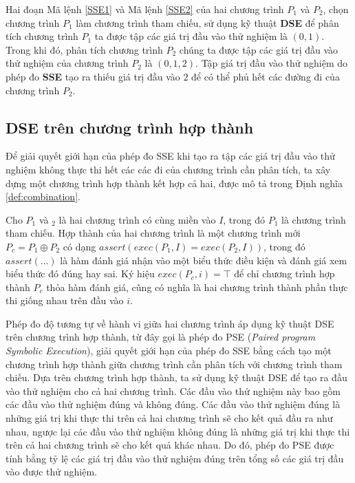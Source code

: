 Hai đoạn Mã lệnh \ref{SSE1} và Mã lệnh \ref{SSE2} của hai chương trình
$P_{1}$ và $P_{2}$, chọn chương trình $P_{1}$ làm chương trình tham
chiếu, sử dụng kỹ thuật \textbf{DSE} để phân tích chương trình $P_{1}$
ta được tập các giá trị đầu vào thử nghiệm là ${(0, 1)}$. Trong khi
đó, phân tích chương trình $P_{2}$ chúng ta được tập các giá trị đầu
vào thử nghiệm của chương trình $P_{2}$ là ${(0, 1, 2)}$. Tập giá trị đầu vào thử nghiệm do phép đo \textbf{SSE} tạo ra thiếu giá trị đầu vào $2$ để có thể phủ hết các đường đi của chương trình $P_{2}$.

\subsection{DSE trên chương trình hợp thành}

Để giải quyết giới hạn của phép đo SSE khi tạo ra tập các giá trị đầu
vào thử nghiệm không thực thi hết các các đi của chương trình cần phân
tích, ta xây dựng một chương trình hợp thành kết hợp cả hai, được mô
tả trong Định nghĩa \ref{def:combination}.

\begin{definition}
  \label{def:combination}
  Cho $P_1$ và $_2$ là hai chương trình có cùng miền vào $I$, trong đó
  $P_1$ là chương trình tham chiếu. Hợp thành của hai chương trình là
  một chương trình mới $P_c = P_1 \oplus P_2$ có dạng
  $assert(exec(P_{1}, I) = exec(P_{2}, I))$, trong đó $assert(\dots)$
  là hàm đánh giá nhận vào một biểu thức điều kiện và đánh giá xem
  biểu thức đó đúng hay sai. Ký hiệu $exec(P_c,i) = \top$ để chỉ
  chương trình hợp thành $P_c$ thỏa hàm đánh giá, cũng có nghĩa là hai
  chương trình thành phần thực thi giống nhau trên đầu vào $i$.
\end{definition}

Phép đo độ tương tự về hành vi giữa hai chương trình áp dụng kỹ thuật
DSE trên chương trình hợp thành, từ đây gọi là phép đo PSE
(\emph{Paired program Symbolic Execution}), giải quyết giới hạn của
phép đo SSE bằng cách tạo một chương trình hợp thành giữa chương trình
cần phân tích với chương trình tham chiếu. Dựa trên chương trình hợp
thành, ta sử dụng kỹ thuật DSE để tạo ra đầu vào thử nghiệm cho cả hai
chương trình. Các đầu vào thử nghiệm này bao gồm các đầu vào thử
nghiệm đúng và không đúng. Các đầu vào thử nghiệm đúng là những giá
trị khi thực thi trên cả hai chương trình sẽ cho kết quả đầu ra như
nhau, ngược lại các đầu vào thử nghiệm không đúng là những giá trị khi
thực thi trên cả hai chương trình sẽ cho kết quả khác nhau. Do đó,
phép đo PSE được tính bằng tỷ lệ các giá trị đầu vào thử
nghiệm đúng trên tổng số các giá trị đầu vào được thử nghiệm.

